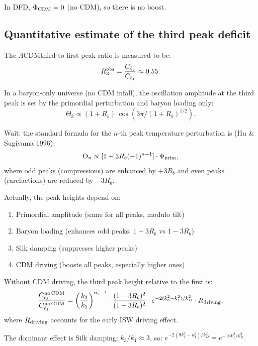 \documentclass[11pt]{article}
\newcommand{\LCDM}{$\Lambda$CDM}
\begin{document}
In DFD, $\Phi_{\rm CDM} = 0$ (no CDM), so there is no boost.

\subsection{Quantitative estimate of the third peak deficit}

The \LCDM third-to-first peak ratio is measured to be:
\begin{equation}
R_3^{\rm obs} = \frac{C_{\ell_3}}{C_{\ell_1}} \approx 0.55.
\end{equation}

In a baryon-only universe (no CDM infall), the oscillation amplitude
at the third peak is set by the primordial perturbation and baryon
loading only:
\begin{equation}
\Theta_3 \propto (1 + R_b)\,\cos(3\pi/(1+R_b)^{1/2}).
\end{equation}

Wait: the standard formula for the $n$-th peak temperature
perturbation is (Hu \& Sugiyama 1996):
\begin{equation}
\Theta_n \propto [1 + 3R_b(-1)^{n-1}]\cdot\Phi_{\rm prim},
\end{equation}
where odd peaks (compressions) are enhanced by $+3R_b$ and even peaks
(rarefactions) are reduced by $-3R_b$.

Actually, the peak heights depend on:
\begin{enumerate}
\item Primordial amplitude (same for all peaks, modulo tilt)
\item Baryon loading (enhances odd peaks: $1+3R_b$ vs $1-3R_b$)
\item Silk damping (suppresses higher peaks)
\item CDM driving (boosts all peaks, especially higher ones)
\end{enumerate}

Without CDM driving, the third peak height relative to the first is:
\begin{equation}
\frac{C_{\ell_3}^{\rm no\,CDM}}{C_{\ell_1}^{\rm no\,CDM}}
= \left(\frac{k_3}{k_1}\right)^{n_s-1}
\cdot\frac{(1+3R_b)^2}{(1+3R_b)^2}
\cdot e^{-2(k_3^2-k_1^2)/k_D^2}\cdot R_{\rm driving},
\end{equation}
where $R_{\rm driving}$ accounts for the early ISW driving effect.

The dominant effect is Silk damping: $k_3/k_1 \approx 3$, so:
$e^{-2(9k_1^2-k_1^2)/k_D^2} = e^{-16k_1^2/k_D^2}$.
\end{document}
